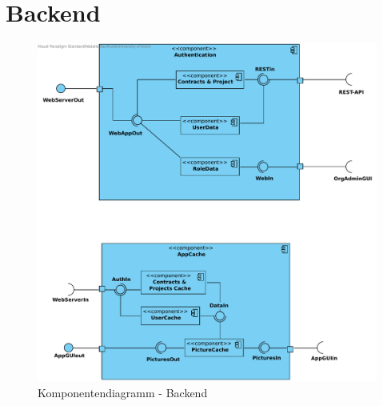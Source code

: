 

\section{Backend}

\begin{figure}[!h]
	\centering
	\includegraphics[width=\linewidth]{img/diagrams/cp_backend.pdf}		
	\caption{Komponentendiagramm - Backend}
	\label{fig:komponentendiagramm-backend}
\end{figure}

